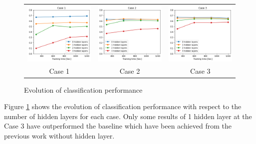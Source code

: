 \documentclass[letterpaper, 10 pt, conference]{ieeeconf}  %
\begin{document}
\begin{figure}[tbh]
    \centering
    \begin{centering}
    \begin{tabular}{ccc}
        \includegraphics[width=0.30\linewidth, trim=0cm 0cm 0cm 0.65cm, clip=true]{10trials/evolAvgC1}&
        \includegraphics[width=0.30\linewidth, trim=0cm 0cm 0cm 0.65cm, clip=true]{10trials/evolAvgC2}&
        \includegraphics[width=0.30\linewidth, trim=0cm 0cm 0cm 0.65cm, clip=true]{10trials/evolAvgC3}\\
        Case 1 & Case 2 & Case 3
        \end{tabular}
     \end{centering}
     \caption{Evolution of classification performance}
     \label{fig:evHlayer}
    \vspace{-10pt}
\end{figure}

Figure \ref{fig:evHlayer} shows the evolution of classification performance with respect to the number of hidden layers for each case. Only some results of 1 hidden layer at the Case 3 have outperformed the baseline which have been achieved from the previous work \cite{hopkins2018spiking} without hidden layer.

\end{document}
